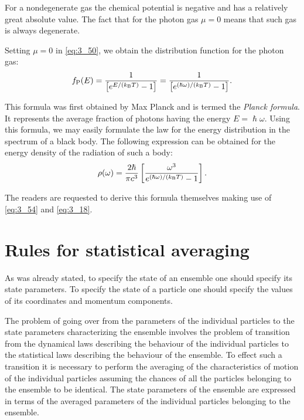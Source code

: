For a nondegenerate gas the chemical potential is negative and has a relatively great absolute value. The fact that for the photon gas $\mu=0$ means that such gas is always degenerate.

Setting $\mu=0$ in \eqref{eq:3_50}, we obtain the distribution function for the photon gas:
\begin{equation}\label{eq:3_54}
    f_{\text{P}}(E) = \frac{1}{\left[e^{E/(k_{\text{B}}T)} - 1\right]} = \frac{1}{\left[e^{(\hslash\omega)/(k_{\text{B}}T)} - 1\right]}.
\end{equation}

\noindent
This formula was first obtained by Max Planck and is termed the \textit{Planck formula}. It represents the average fraction of photons having the energy $E=\hslash\omega$. Using this formula, we may easily formulate the law for the energy distribution in the spectrum of a black body. The following expression can be obtained for the energy density of the radiation of such a body:
\begin{equation}\label{eq:3_55}
    \rho(\omega) = \frac{2\hslash}{\pi c^3} \left[\frac{\omega^3}{e^{(\hslash\omega)/(k_{\text{B}}T)} - 1}\right].
\end{equation}

The readers are requested to derive this formula themselves making use of \eqref{eq:3_54} and \eqref{eq:3_18}.

\section{Rules for statistical averaging}\label{sec:29}

As was already stated, to specify the state of an ensemble one should specify its state parameters. To specify the state of a particle one should specify the values of its coordinates and momentum components.

The problem of going over from the parameters of the individual particles to the state parameters characterizing the ensemble involves the problem of transition from the dynamical laws describing the behaviour of the individual particles to the statistical laws describing the behaviour of the ensemble. To effect such a transition it is necessary to perform the averaging of the characteristics of motion of the individual particles assuming the chances of all the particles belonging to the ensemble to be identical. The state parameters of the ensemble are expressed in terms of the averaged parameters of the individual particles belonging to the ensemble.

